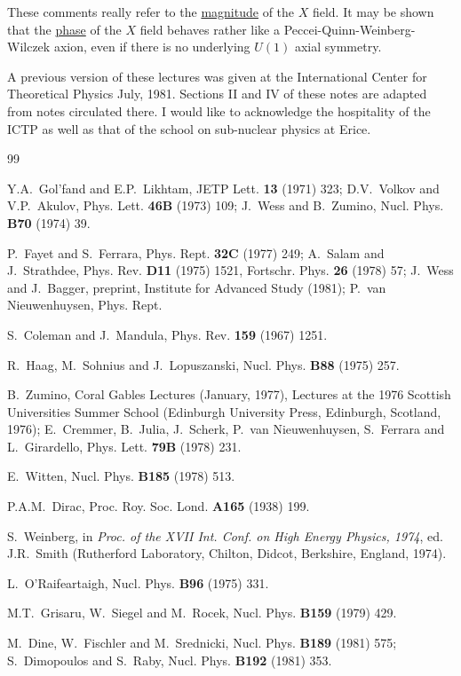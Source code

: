 \documentclass[11pt,a4paper]{article}
\begin{document}
These comments really refer to the \underline{magnitude} of the $X$ field.
It may be shown that the \underline{phase} of the $X$ field behaves rather like a
Peccei-Quinn-Weinberg-Wilczek axion, even if there is no underlying
$U(1)$ axial symmetry.

A previous version of these lectures was given at the International
Center for Theoretical Physics July, 1981. Sections II and
IV of these notes are adapted from notes circulated there. I would
like to acknowledge the hospitality of the ICTP as well as that of
the school on sub-nuclear physics at Erice.

\begin{thebibliography}{99}

Y.A.~Gol'fand and E.P.~Likhtam,
JETP Lett. {\bf 13} (1971) 323;
D.V.~Volkov and V.P.~Akulov,
Phys. Lett. {\bf 46B} (1973) 109;
J.~Wess and B.~Zumino,
Nucl. Phys. {\bf B70} (1974) 39.

P.~Fayet and S.~Ferrara,
Phys. Rept. {\bf 32C} (1977) 249;
A.~Salam and J.~Strathdee,
Phys. Rev. {\bf D11} (1975) 1521,
Fortschr. Phys. {\bf 26} (1978) 57;
J.~Wess and J.~Bagger,
preprint, Institute for Advanced Study (1981);
P.~van Nieuwenhuysen,
Phys. Rept.

S.~Coleman and J.~Mandula,
Phys. Rev. {\bf 159} (1967) 1251.

R.~Haag, M.~Sohnius and J.~Lopuszanski,
Nucl. Phys. {\bf B88} (1975) 257.

B.~Zumino,
Coral Gables Lectures (January, 1977),
Lectures at the 1976 Scottish Universities Summer School
(Edinburgh University Press, Edinburgh, Scotland, 1976);
E.~Cremmer, B.~Julia, J.~Scherk, P.~van Nieuwenhuysen,
S.~Ferrara and L.~Girardello,
Phys. Lett. {\bf 79B} (1978) 231.

E.~Witten,
Nucl. Phys. {\bf B185} (1978) 513.

P.A.M.~Dirac,
Proc. Roy. Soc. Lond. {\bf A165} (1938) 199.

S.~Weinberg,
in {\it Proc. of the XVII Int. Conf. on High Energy Physics, 1974},
ed. J.R.~Smith
(Rutherford Laboratory, Chilton, Didcot, Berkshire, England, 1974).

L.~O'Raifeartaigh,
Nucl. Phys. {\bf B96} (1975) 331.

M.T.~Grisaru, W.~Siegel and M.~Rocek,
Nucl. Phys. {\bf B159} (1979) 429.

M.~Dine, W.~Fischler and M.~Srednicki,
Nucl. Phys. {\bf B189} (1981) 575;
S.~Dimopoulos and S.~Raby,
Nucl. Phys. {\bf B192} (1981) 353.


\end{thebibliography}
\end{document}

